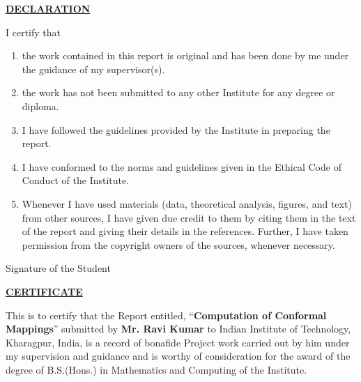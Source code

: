 \documentclass[12pt,a4paper]{article}
\begin{document}
\newpage

\thispagestyle{empty}

\begin{center}
\textbf{\underline{DECLARATION}}
\end{center}

\vspace{2cm}

I certify that

\vspace{1cm}

\begin{enumerate}[label=\alph*., leftmargin=2cm]
\item the work contained in this report is original and has been done by me under the guidance of my supervisor(s).

\item the work has not been submitted to any other Institute for any degree or diploma.

\item I have followed the guidelines provided by the Institute in preparing the report.

\item I have conformed to the norms and guidelines given in the Ethical Code of Conduct of the Institute.

\item Whenever I have used materials (data, theoretical analysis, figures, and text) from other sources, I have given due credit to them by citing them in the text of the report and giving their details in the references. Further, I have taken permission from the copyright owners of the sources, whenever necessary.
\end{enumerate}

\vspace{3cm}

\hfill Signature of the Student

\newpage

\thispagestyle{empty}

\begin{center}
\textbf{\underline{CERTIFICATE}}
\end{center}

\vspace{2cm}

This is to certify that the Report entitled, ``\textbf{Computation of Conformal Mappings}'' submitted by \textbf{Mr. Ravi Kumar} to Indian Institute of Technology, Kharagpur, India, is a record of bonafide Project work carried out by him under my supervision and guidance and is worthy of consideration for the award of the degree of B.S.(Hons.) in Mathematics and Computing of the Institute.
\end{document}
